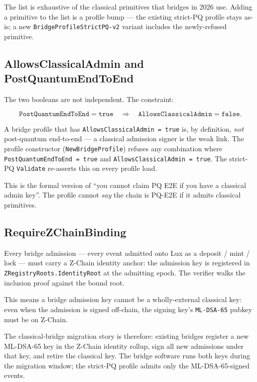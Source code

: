 The list is exhaustive of the classical primitives that bridges in 2026 use.
Adding a primitive to the list is a profile bump --- the existing strict-PQ
profile stays as-is; a new \texttt{BridgeProfileStrictPQ-v2} variant
includes the newly-refused primitive.

\subsection{AllowsClassicalAdmin and PostQuantumEndToEnd}

The two booleans are not independent. The constraint:

\[
\texttt{PostQuantumEndToEnd} = \texttt{true} \quad \Longrightarrow \quad
\texttt{AllowsClassicalAdmin} = \texttt{false}.
\]

A bridge profile that has \texttt{AllowsClassicalAdmin = true} is, by
definition, \emph{not} post-quantum end-to-end --- a classical admission
signer is the weak link. The profile constructor (\texttt{NewBridgeProfile})
refuses any combination where \texttt{PostQuantumEndToEnd = true} and
\texttt{AllowsClassicalAdmin = true}. The strict-PQ \texttt{Validate}
re-asserts this on every profile load.

This is the formal version of ``you cannot claim PQ E2E if you have a
classical admin key''. The profile cannot \emph{say} the chain is PQ-E2E if
it admits classical primitives.

\subsection{RequireZChainBinding}

Every bridge admission --- every event admitted onto Lux as a
deposit / mint / lock --- must carry a Z-Chain identity anchor: the
admission key is registered in \texttt{ZRegistryRoots.IdentityRoot} at the
admitting epoch. The verifier walks the inclusion proof against the bound
root.

This means a bridge admission key cannot be a wholly-external classical
key: even when the admission is signed off-chain, the signing key's
\texttt{ML-DSA-65} pubkey must be on Z-Chain.

The classical-bridge migration story is therefore: existing bridges
register a new ML-DSA-65 key in the Z-Chain identity rollup, sign all
new admissions under that key, and retire the classical key. The bridge
software runs both keys during the migration window; the strict-PQ profile
admits only the ML-DSA-65-signed events.

